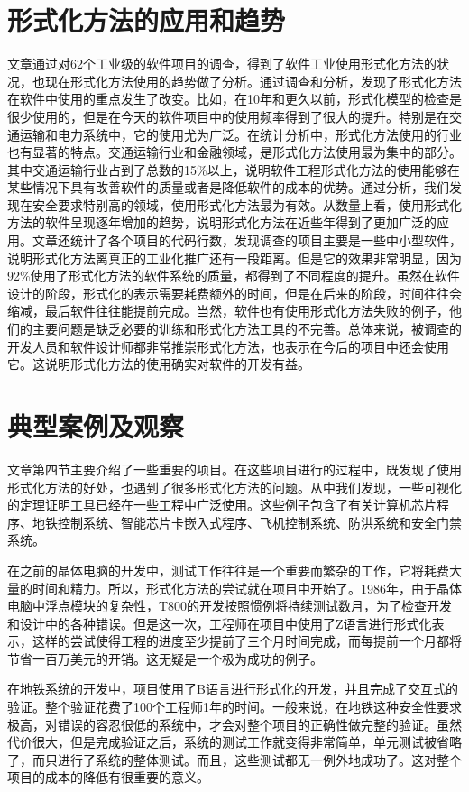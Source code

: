 \documentclass{article}
\begin{document}
\begin{CJK}{UTF8}{gbsn}
\begin{spacing}{1.4}
\section{形式化方法的应用和趋势}
文章通过对62个工业级的软件项目的调查，得到了软件工业使用形式化方法的状况，也现在形式化方法使用的趋势做了分析。通过调查和分析，发现了形式化方法在软件中使用的重点发生了改变。比如，在10年和更久以前，形式化模型的检查是很少使用的，但是在今天的软件项目中的使用频率得到了很大的提升。特别是在交通运输和电力系统中，它的使用尤为广泛。在统计分析中，形式化方法使用的行业也有显著的特点。交通运输行业和金融领域，是形式化方法使用最为集中的部分。其中交通运输行业占到了总数的15\%以上，说明软件工程形式化方法的使用能够在某些情况下具有改善软件的质量或者是降低软件的成本的优势。通过分析，我们发现在安全要求特别高的领域，使用形式化方法最为有效。从数量上看，使用形式化方法的软件呈现逐年增加的趋势，说明形式化方法在近些年得到了更加广泛的应用。文章还统计了各个项目的代码行数，发现调查的项目主要是一些中小型软件，说明形式化方法离真正的工业化推广还有一段距离。但是它的效果非常明显，因为92\%使用了形式化方法的软件系统的质量，都得到了不同程度的提升。虽然在软件设计的阶段，形式化的表示需要耗费额外的时间，但是在后来的阶段，时间往往会缩减，最后软件往往能提前完成。当然，软件也有使用形式化方法失败的例子，他们的主要问题是缺乏必要的训练和形式化方法工具的不完善。总体来说，被调查的开发人员和软件设计师都非常推崇形式化方法，也表示在今后的项目中还会使用它。这说明形式化方法的使用确实对软件的开发有益。

\section{典型案例及观察}
文章第四节主要介绍了一些重要的项目。在这些项目进行的过程中，既发现了使用形式化方法的好处，也遇到了很多形式化方法的问题。从中我们发现，一些可视化的定理证明工具已经在一些工程中广泛使用。这些例子包含了有关计算机芯片程序、地铁控制系统、智能芯片卡嵌入式程序、飞机控制系统、防洪系统和安全门禁系统。

在之前的晶体电脑的开发中，测试工作往往是一个重要而繁杂的工作，它将耗费大量的时间和精力。所以，形式化方法的尝试就在项目中开始了。1986年，由于晶体电脑中浮点模块的复杂性，T800的开发按照惯例将持续测试数月，为了检查开发和设计中的各种错误。但是这一次，工程师在项目中使用了Z语言进行形式化表示，这样的尝试使得工程的进度至少提前了三个月时间完成，而每提前一个月都将节省一百万美元的开销。这无疑是一个极为成功的例子。

在地铁系统的开发中，项目使用了B语言进行形式化的开发，并且完成了交互式的验证。整个验证花费了100个工程师1年的时间。一般来说，在地铁这种安全性要求极高，对错误的容忍很低的系统中，才会对整个项目的正确性做完整的验证。虽然代价很大，但是完成验证之后，系统的测试工作就变得非常简单，单元测试被省略了，而只进行了系统的整体测试。而且，这些测试都无一例外地成功了。这对整个项目的成本的降低有很重要的意义。


\end{spacing}
\end{CJK}
\end{document}
